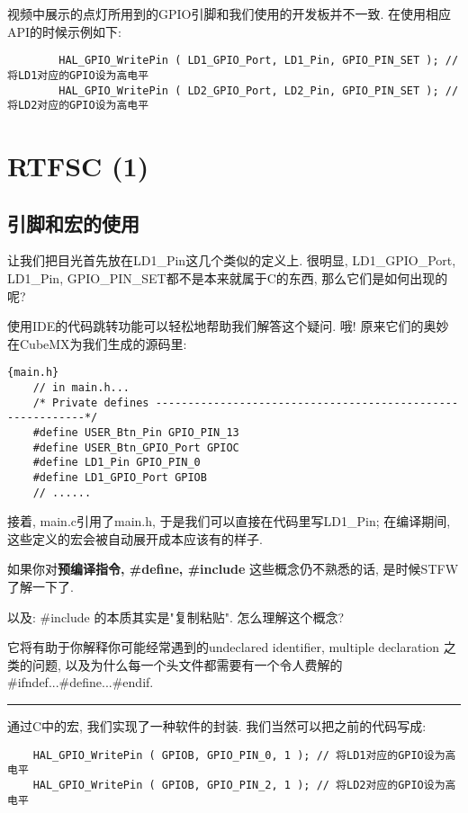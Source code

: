 \begin{definition}
	视频中展示的点灯所用到的GPIO引脚和我们使用的开发板并不一致. 在使用相应API的时候示例如下:

	\lstset{language=C}
	\begin{lstlisting}
		HAL_GPIO_WritePin ( LD1_GPIO_Port, LD1_Pin, GPIO_PIN_SET ); // 将LD1对应的GPIO设为高电平
		HAL_GPIO_WritePin ( LD2_GPIO_Port, LD2_Pin, GPIO_PIN_SET ); // 将LD2对应的GPIO设为高电平
	\end{lstlisting}

\end{definition}


\section{RTFSC (1)}

\subsection{引脚和宏的使用}
让我们把目光首先放在LD1\_Pin这几个类似的定义上. 很明显, LD1\_GPIO\_Port, LD1\_Pin, GPIO\_PIN\_SET都不是本来就属于C的东西, 那么它们是如何出现的呢?

使用IDE的代码跳转功能可以轻松地帮助我们解答这个疑问. 哦! 原来它们的奥妙在CubeMX为我们生成的源码里:
\begin{lstlisting}{main.h}
	// in main.h...
	/* Private defines -----------------------------------------------------------*/
	#define USER_Btn_Pin GPIO_PIN_13
	#define USER_Btn_GPIO_Port GPIOC
	#define LD1_Pin GPIO_PIN_0
	#define LD1_GPIO_Port GPIOB
	// ......
\end{lstlisting}

接着, main.c引用了main.h, 于是我们可以直接在代码里写LD1\_Pin; 在编译期间, 这些定义的宏会被自动展开成本应该有的样子.

\begin{problem}
如果你对\textbf{预编译指令, \#define, \#include} 这些概念仍不熟悉的话, 是时候STFW了解一下了.

以及: \#include 的本质其实是"复制粘贴". 怎么理解这个概念?

它将有助于你解释你可能经常遇到的undeclared identifier, multiple declaration 之类的问题, 以及为什么每一个头文件都需要有一个令人费解的\#ifndef...\#define...\#endif.
\end{problem}
\vspace{15pt}
\hrule
\vspace{10pt}
通过C中的宏, 我们实现了一种软件的封装. 我们当然可以把之前的代码写成:
\begin{lstlisting}
	HAL_GPIO_WritePin ( GPIOB, GPIO_PIN_0, 1 ); // 将LD1对应的GPIO设为高电平
	HAL_GPIO_WritePin ( GPIOB, GPIO_PIN_2, 1 ); // 将LD2对应的GPIO设为高电平
\end{lstlisting}

